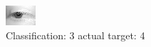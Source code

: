 \begin{figure}[h!]
\begin{center}
\includegraphics[width=0.60\columnwidth]{figures/ID2640_class_3_target_4.png}
\end{center}
\caption{ Classification: 3 actual target: 4}
\label{fig:ID2640_class_3_target_4}
\end{figure}
